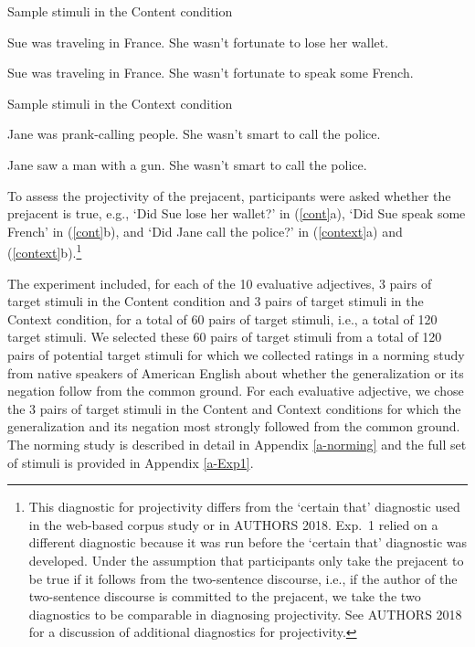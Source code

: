 \documentclass[11pt,fleqn]{article}
\newcommand{\6}{\mbox{$[\hspace*{-.6mm}[$}}
\newcommand{\9}{\mbox{$]\hspace*{-.6mm}]$}}
\begin{document}
\begin{exe}
\ex\label{cont} Sample stimuli in the Content condition 

\begin{xlist}
\ex Sue was traveling in France. She wasn't fortunate to lose her wallet.  

\ex Sue was traveling in France. She wasn't fortunate to speak some French.
\end{xlist}

\ex\label{context} Sample stimuli in the Context condition

\begin{xlist}
\ex Jane was prank-calling people. She wasn't smart to call the police. 

\ex Jane saw a man with a gun. She wasn't smart to call the police. 
\end{xlist}
\end{exe}
To assess the projectivity of the prejacent, participants were asked whether the prejacent is true, e.g., `Did Sue lose her wallet?' in (\ref{cont}a), `Did Sue speak some French' in (\ref{cont}b), and `Did Jane call the police?' in (\ref{context}a) and (\ref{context}b).\footnote{This diagnostic for projectivity differs from the `certain that' diagnostic used in the web-based corpus study or in AUTHORS 2018. Exp.~1 relied on a different diagnostic because it was run before the `certain that' diagnostic was developed. Under the assumption that participants only take the prejacent to be true if it follows from the two-sentence discourse, i.e., if the author of the two-sentence discourse is committed to the prejacent, we take the two diagnostics to be comparable in diagnosing projectivity. See AUTHORS 2018 for a discussion of additional diagnostics for projectivity.}

The experiment included, for each of the 10 evaluative adjectives, 3 pairs of target stimuli in the Content condition and 3 pairs of target stimuli in the Context condition, for a total of 60 pairs of target stimuli, i.e., a total of 120 target stimuli. We selected these 60 pairs of target stimuli from a total of 120 pairs of potential target stimuli for which we collected ratings in a norming study from native speakers of American English about whether the generalization or its negation follow from the common ground. For each evaluative adjective, we chose the 3 pairs of target stimuli in the Content and Context conditions for which the generalization and its negation most strongly followed from the common ground. The norming study is described in detail in Appendix \ref{a-norming} and the full set of stimuli is provided in Appendix \ref{a-Exp1}.
\end{document}
